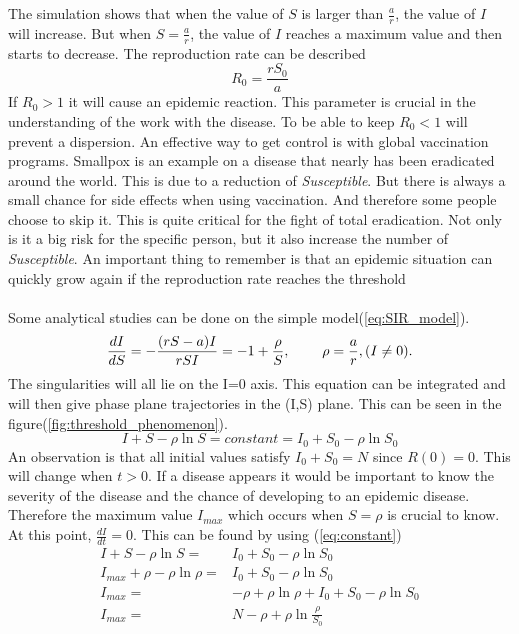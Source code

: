 \documentclass[%
twoside,                 %
final,                   %
10pt]{article}
\begin{document}
The simulation shows that when the value of $S$ is larger than $\frac{a}{r}$, the value of $I$ will increase. But when $S = \frac{a}{r}$, the value of $I$ reaches a maximum value and then starts to decrease. The reproduction rate can be described
\begin{equation}
R_0 = \frac{rS_0}{a}
\end{equation}
If $R_0 > 1$ it will cause an epidemic reaction. This parameter is crucial in the understanding of the work with the disease. To be able to keep $R_0 < 1$ will prevent a dispersion. An effective way to get control is with global vaccination programs. Smallpox is an example on a disease that nearly has been eradicated around the world. This is due to a reduction of \emph{Susceptible}. But there is always a small chance for side effects when using vaccination. And therefore some people choose to skip it. This is quite critical for the fight of total eradication. Not only is it a big risk for the specific person, but it also increase the number of \emph{Susceptible}. An important thing to remember is that an epidemic situation can quickly grow again if the reproduction rate reaches the threshold
\\
\\
Some analytical studies can be done on the simple model(\ref{eq:SIR_model}).
\begin{equation} 
\frac{dI}{dS} = -\frac{(rS-a)I}{rSI} = -1 + \frac{\rho}{S},\hspace{8mm}\rho=\frac{a}{r}, (I\neq0).
\end{equation}
The singularities will all lie on the I=0 axis. This equation can be integrated and will then give phase plane trajectories in the (I,S) plane. This can be seen in the figure(\ref{fig:threshold_phenomenon}).
\begin{equation} \label{eq:constant}
I+S-\rho \ln S = constant = I_0 + S_0 - \rho \ln S_0
\end{equation}
An observation is that all initial values satisfy $I_0+S_0=N$ since $R(0) = 0$. This will change when $t>0$. If a disease appears it would be important to know the severity of the disease and the chance of developing to an epidemic disease. Therefore the maximum value $I_{max}$ which occurs when $S=\rho$ is crucial to know. At this point, $\frac{dI}{dt}=0$. This can be found by using (\ref{eq:constant})
\begin{align} 
I+S-\rho \ln S =& I_0 + S_0 - \rho \ln S_0 \nonumber \\
I_{max}+\rho-\rho \ln \rho =& I_0 + S_0 - \rho \ln S_0\nonumber \\
I_{max}=&- \rho+\rho \ln \rho + I_0 + S_0 - \rho \ln S_0\nonumber \\
I_{max}=&N - \rho + \rho \ln\frac{\rho}{S_0} \label{eq:max_I}
\end{align}
\end{document}
